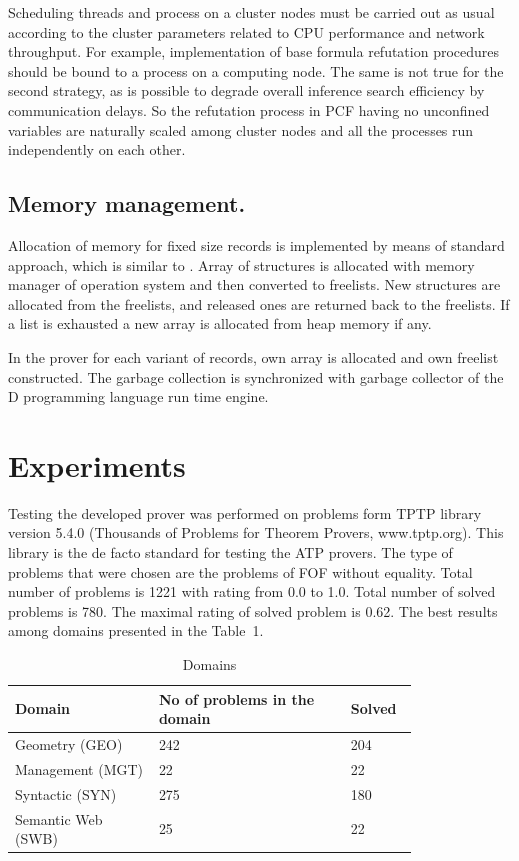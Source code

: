 \documentclass[runningheads,a4paper]{llncs}
\begin{document}
Scheduling threads and process on a cluster nodes must be carried out as usual according to the cluster parameters related to CPU performance and network throughput. For example, implementation of base formula refutation procedures should be bound to a process on a computing node. The same is not true for the second strategy, as is possible to degrade overall inference search efficiency by communication delays. So the refutation process in PCF having no unconfined variables are naturally scaled among cluster nodes and all the processes run independently on each other.

\subsection{Memory management.}
Allocation of memory for fixed size records is implemented by means of standard approach, which is similar to \cite{gmemory}. Array of structures is allocated with memory manager of operation system and then converted to freelists. New structures are allocated from the freelists, and released ones are returned back to the freelists. If a list is exhausted a new array is allocated from heap memory if any.

In the prover for each variant of records, own array is allocated and own freelist constructed. The garbage collection is synchronized with garbage collector of the D programming language run time engine.


\section{Experiments}
Testing the developed prover was performed on problems form TPTP \cite{tptp} library version 5.4.0 (Thousands of Problems for Theorem Provers, www.tptp.org). This library is the de facto standard for testing the ATP provers. The type of problems that were chosen are the problems of FOF without equality. Total number of problems is 1221 with rating from 0.0 to 1.0. Total number of solved problems is 780. The maximal rating of solved problem is 0.62. The best results among domains presented in the Table~1.

\begin{table}
\caption{Domains}
\begin{tabular}{|p{0.3\linewidth}|p{0.4\linewidth}|p{0.1\linewidth}|}

\hline
\textbf{Domain} & \textbf{No of problems in the domain} & \textbf{Solved} \\
\hline
Geometry (GEO) & 242 & 204 \\
\hline
Management (MGT) & 22 & 22 \\
\hline
Syntactic  (SYN) & 275 & 180 \\
\hline
Semantic Web  (SWB) & 25 & 22 \\
\hline
\end{tabular}
\end{table}
\end{document}

